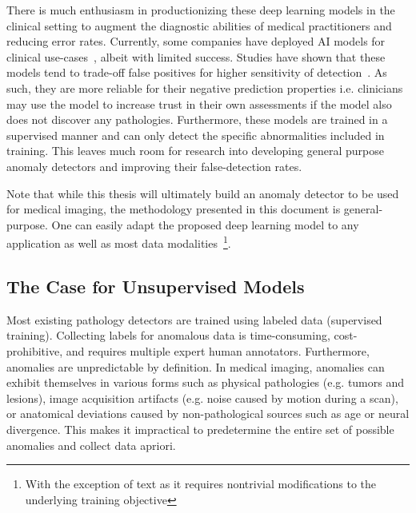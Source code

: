 There is much enthusiasm in productionizing these deep learning models in the clinical setting to augment the diagnostic abilities of medical practitioners and reducing error rates. Currently, some companies have deployed AI models for clinical use-cases~\cite{CHAMBERLIN2023e368}, albeit with limited success. Studies have shown that these models tend to trade-off false positives for higher sensitivity of detection~\cite{niehoffEvaluationClinicalPerformance2023}. As such, they are more reliable for their negative prediction properties i.e. clinicians may use the model to increase trust in their own assessments if the model also does not discover any pathologies. Furthermore, these models are trained in a supervised manner and can only detect the specific abnormalities included in training. This leaves much room for research into developing general purpose anomaly detectors and improving their false-detection rates.

Note that while this thesis will ultimately build an anomaly detector to be used for medical imaging, the methodology presented in this document is general-purpose. One can easily adapt the proposed deep learning model to any application as well as most data modalities~\footnote{With the exception of text as it requires nontrivial modifications to the underlying training objective}.



\subsection*{The Case for Unsupervised Models}

Most existing pathology detectors are trained using labeled data (supervised training). Collecting labels for anomalous data is time-consuming, cost-prohibitive, and requires multiple expert human annotators.  Furthermore, anomalies are unpredictable by definition. In medical imaging, anomalies can exhibit themselves in various forms such as physical pathologies (e.g. tumors and lesions), image acquisition artifacts (e.g. noise caused by motion during a scan), or anatomical deviations caused by non-pathological sources such as age or neural divergence.
This makes it impractical to predetermine the entire set of possible anomalies and collect data apriori.

